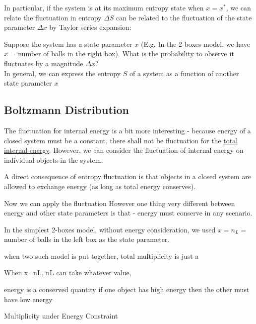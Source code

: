 \documentclass[class=article, crop=false, 12pt]{standalone}
\begin{document}
In particular, if the system is at its maximum entropy state when $x=x^\ast$,
we can relate the fluctuation in entropy $\Delta S$ can be related to 
the fluctuation of the state parameter $\Delta x$ by Taylor series expansion:


Suppose the system has a state parameter $x$ 
(E.g. In the 2-boxes model, we have $x$ = number of balls in the right box).
What is the probability to observe it fluctuates by a magnitude $\Delta x$?\\



In general, we can express the entropy $S$ of a system as a function of another state parameter $x$ 




\subsection{Boltzmann Distribution}

The fluctuation for internal energy is a bit more interesting - 
because energy of a closed system must be a constant, 
there shall not be fluctuation for the \ul{total internal energy}.
However, we can consider the fluctuation of internal energy on individual objects in the system.


A direct consequence of entropy fluctuation is that objects in a closed system are allowed to exchange energy
(as long as total energy conserves).



Now we can apply the fluctuation 
However one thing very different between energy and other state parameters is that -
energy must conserve in any scenario. 






In the simplest 2-boxes model, without energy consideration,
we used $x=n_L=$ number of balls in the left box as the state parameter. 

when two such model is put together,
total multiplicity is just a 

When x=nL, 
nL can take whatever value, 

energy is a conserved quantity
if one object has high energy then the other must have low energy

Multiplicity under Energy Constraint
\end{document}
